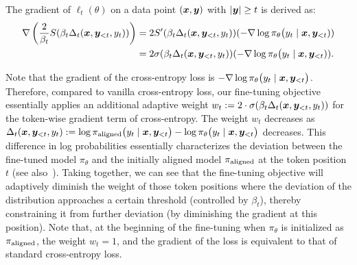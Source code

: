 
The gradient of $\ell_t(\theta)$ on a data point $(\bm{x}, \bm{y})$ with $|\bm{y}| \ge t$ is derived as:
\begin{align}
    \nabla \left( \frac{2}{\beta_t} S(\beta_t \Delta_t(\bm{x}, \bm{y}_{<t}, y_t)) \right)
    &= 
    2 S'(\beta_t \Delta_t(\bm{x}, \bm{y}_{<t}, y_t)) (-\nabla \log \pi_{\theta}\big(y_t \mid \bm{x}, \bm{y}_{<t})) \nonumber \\
    &= 2  \sigma(\beta_t \Delta_t(\bm{x}, \bm{y}_{<t}, y_t)) (-\nabla \log \pi_{\theta}\big(y_t \mid \bm{x}, \bm{y}_{<t})).
\end{align}

Note that the gradient of the cross-entropy loss is $-\nabla \log \pi_{\theta}\big(y_t \mid \bm{x}, \bm{y}_{<t}\big)$.
Therefore, compared to vanilla cross-entropy loss, our fine-tuning objective essentially applies an additional adaptive weight $w_t := 2\cdot \sigma(\beta_t \Delta_t(\bm{x}, \bm{y}_{<t}, y_t))$ for the token-wise gradient term of cross-entropy. The weight $w_t$ decreases as $\Delta_t(\bm{x}, \bm{y}_{<t}, y_t) := \log \pi_{\mathrm{aligned}}\big(y_t \mid \bm{x}, \bm{y}_{<t} \big) - \log \pi_{\theta}\big(y_t \mid \bm{x}, \bm{y}_{<t} \big)$ decreases.
This difference in log probabilities essentially characterizes the deviation between the fine-tuned model $\pi_{\theta}$ and the initially aligned model $\pi_{\mathrm{aligned}}$ at the token position $t$ (see also~).
Taking together, we can see that the fine-tuning objective will adaptively diminish the weight of those token positions where the deviation of the distribution approaches a certain threshold (controlled by $\beta_t$), thereby constraining it from further deviation (by diminishing the gradient at this position). Note that, at the beginning of the fine-tuning when $\pi_\theta$ is initialized as $\pi_{\mathrm{aligned}}$, the weight $w_t = 1$, and the gradient of the loss is equivalent to that of standard cross-entropy loss.%



